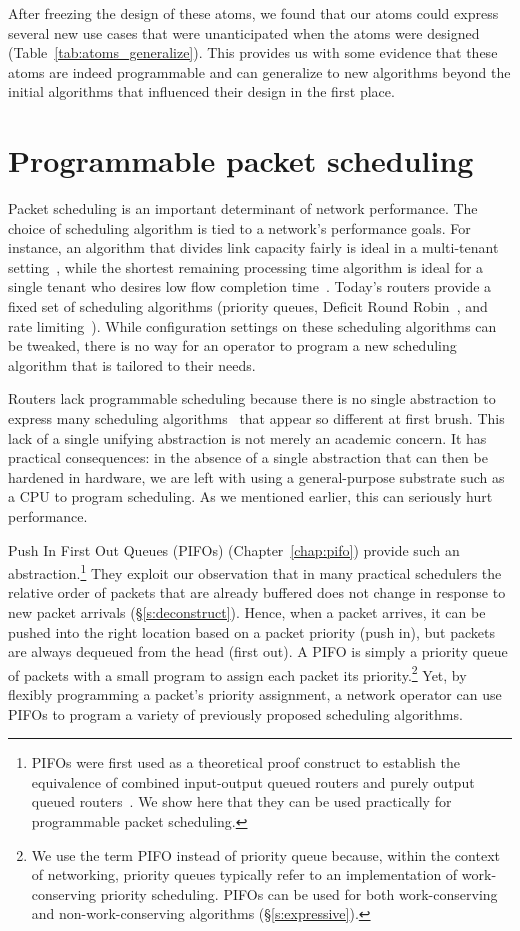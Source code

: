 After freezing the design of these atoms, we found that our atoms could express
several new use cases that were unanticipated when the atoms were designed
(Table~\ref{tab:atoms_generalize}). This provides us with some evidence that
these atoms are indeed programmable and can generalize to new algorithms beyond
the initial algorithms that influenced their design in the first place.

\section{Programmable packet scheduling}
Packet scheduling is an important determinant of network performance. The
choice of scheduling algorithm is tied to a network's performance goals. For
instance, an algorithm that divides link capacity fairly is ideal in a
multi-tenant setting~\cite{wfq}, while the shortest remaining processing time
algorithm is ideal for a single tenant who desires low flow completion
time~\cite{pFabric}. Today's routers provide a fixed set of scheduling
algorithms (\eg priority queues, Deficit Round Robin~\cite{drr}, and rate
limiting~\cite{tbf}). While configuration settings on these scheduling
algorithms can be tweaked, there is no way for an operator to program a new
scheduling algorithm that is tailored to their needs.

Routers lack programmable scheduling because there is no single abstraction to
express many scheduling algorithms~\cite{wfq, srpt, srr, pFabric, lstf} that
appear so different at first brush. This lack of a single unifying abstraction
is not merely an academic concern. It has practical consequences: in the
absence of a single abstraction that can then be hardened in hardware, we are
left with using a general-purpose substrate such as a CPU to program
scheduling. As we mentioned earlier, this can seriously hurt performance.

 Push In First Out Queues (PIFOs) (Chapter~\ref{chap:pifo}) provide such an
abstraction.\footnote{PIFOs were first used as a theoretical proof construct to
establish the equivalence of combined input-output queued routers and purely
output queued routers~\cite{pifo}. We show here that they can be used
practically for programmable packet scheduling.} They exploit our observation
that in many practical schedulers the relative order of packets that are
already buffered does not change in response to new packet arrivals
(\S\ref{s:deconstruct}). Hence, when a packet arrives, it can be pushed into
the right location based on a packet priority (push in), but packets are always
dequeued from the head (first out). A PIFO is simply a priority queue of
packets with a small program to assign each packet its priority.\footnote{We use
the term PIFO instead of priority queue because, within the context of
networking, priority queues typically refer to an implementation of
work-conserving priority scheduling. PIFOs can be used for both work-conserving
and non-work-conserving algorithms (\S\ref{s:expressive}).} Yet, by flexibly
programming a packet's priority assignment, a network operator can use PIFOs to
program a variety of previously proposed scheduling algorithms. 

